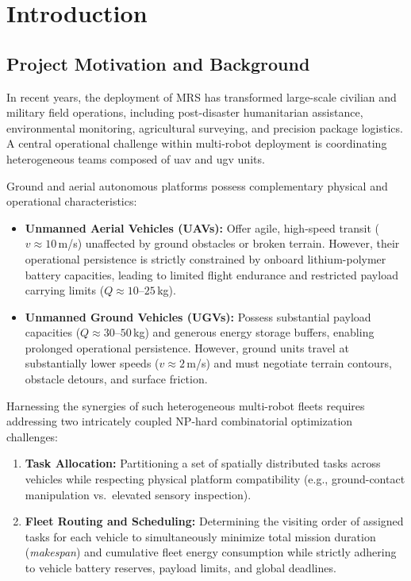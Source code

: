 \chapter{Introduction}\label{chap:intro}

\section{Project Motivation and Background} \label{sec:intro_background}
In recent years, the deployment of \acf{MRS} has transformed large-scale civilian and military field operations, including post-disaster humanitarian assistance, environmental monitoring, agricultural surveying, and precision package logistics. A central operational challenge within multi-robot deployment is coordinating heterogeneous teams composed of \ac{uav} and \ac{ugv} units.

Ground and aerial autonomous platforms possess complementary physical and operational characteristics:
\begin{itemize}
    \item \textbf{Unmanned Aerial Vehicles (UAVs):} Offer agile, high-speed transit ($v \approx 10$\,m/s) unaffected by ground obstacles or broken terrain. However, their operational persistence is strictly constrained by onboard lithium-polymer battery capacities, leading to limited flight endurance and restricted payload carrying limits ($Q \approx 10\text{--}25$\,kg).
    \item \textbf{Unmanned Ground Vehicles (UGVs):} Possess substantial payload capacities ($Q \approx 30\text{--}50$\,kg) and generous energy storage buffers, enabling prolonged operational persistence. However, ground units travel at substantially lower speeds ($v \approx 2$\,m/s) and must negotiate terrain contours, obstacle detours, and surface friction.
\end{itemize}

Harnessing the synergies of such heterogeneous multi-robot fleets requires addressing two intricately coupled NP-hard combinatorial optimization challenges:
\begin{enumerate}
    \item \textbf{Task Allocation:} Partitioning a set of spatially distributed tasks across vehicles while respecting physical platform compatibility (e.g., ground-contact manipulation vs.\ elevated sensory inspection).
    \item \textbf{Fleet Routing and Scheduling:} Determining the visiting order of assigned tasks for each vehicle to simultaneously minimize total mission duration (\textit{makespan}) and cumulative fleet energy consumption while strictly adhering to vehicle battery reserves, payload limits, and global deadlines.
\end{enumerate}

